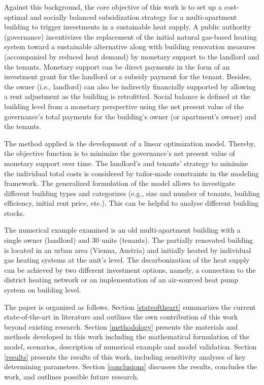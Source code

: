 Against this background, the core objective of this work is to set up a cost-optimal and socially balanced subsidization strategy for a multi-apartment building to trigger investments in a sustainable heat supply. A public authority (governance) incentivizes the replacement of the initial natural gas-based heating system toward a sustainable alternative along with building renovation measures (accompanied by reduced heat demand) by monetary support to the landlord and the tenants. Monetary support can be direct payments in the form of an investment grant for the landlord or a subsidy payment for the tenant. Besides, the owner (i.e., landlord) can also be indirectly financially supported by allowing a rent adjustment as the building is retrofitted. Social balance is defined at the building level from a monetary perspective using the net present value of the governance's total payments for the building's owner (or apartment's owner) and the tenants.\vspace{0.5cm}

The method applied is the development of a linear optimization model. Thereby, the objective function is to minimize the governance's net present value of monetary support over time. The landlord's and tenants' strategy to minimize the individual total costs is considered by tailor-made constraints in the modeling framework. The generalized formulation of the model allows to investigate different building types and categorizes (e.g., size and number of tenants, building efficiency, initial rent price, etc.). This can be helpful to analyse different building stocks.\vspace{0.5cm}

The numerical example examined is an old multi-apartment building with a single owner (landlord) and 30 units (tenants). The partially renovated building is located in an urban area (Vienna, Austria) and initially heated by individual gas heating systems at the unit's level. The decarbonization of the heat supply can be achieved by two different investment options, namely, a connection to the district heating network or an implementation of an air-sourced heat pump system on building level.\vspace{0.5cm}

The paper is organized as follows. Section \ref{stateoftheart} summarizes the current state-of-the-art in literature and outlines the own contribution of this work beyond existing research. Section \ref{methodology} presents the materials and methods developed in this work including the mathematical formulation of the model, scenarios, description of numerical example and model validation. Section \ref{results} presents the results of this work, including sensitivity analyses of key determining parameters. Section \ref{conclusions} discusses the results, concludes the work, and outlines possible future research.